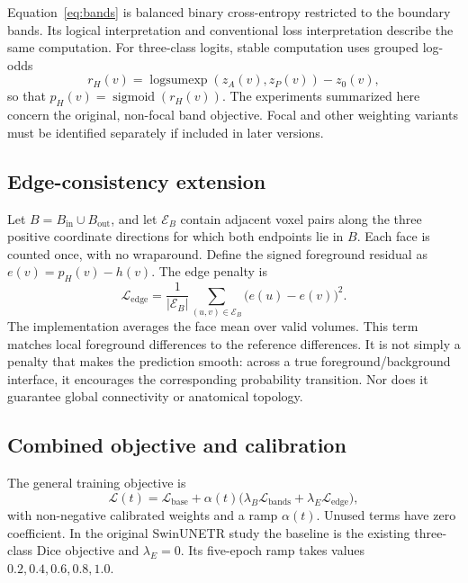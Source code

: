 Equation~\ref{eq:bands} is balanced binary cross-entropy restricted to the boundary bands. Its logical interpretation and conventional loss interpretation describe the same computation. For three-class logits, stable computation uses grouped log-odds
\begin{equation}
r_H(v)=\operatorname{logsumexp}(z_A(v),z_P(v))-z_0(v),
\end{equation}
so that $p_H(v)=\operatorname{sigmoid}(r_H(v))$. The experiments summarized here concern the original, non-focal band objective. Focal and other weighting variants must be identified separately if included in later versions.

\subsection{Edge-consistency extension}
Let $B=B_{\mathrm{in}}\cup B_{\mathrm{out}}$, and let $\mathcal{E}_B$ contain adjacent voxel pairs along the three positive coordinate directions for which both endpoints lie in $B$. Each face is counted once, with no wraparound. Define the signed foreground residual as $e(v)=p_H(v)-h(v)$. The edge penalty is
\begin{equation}\label{eq:edge}
\mathcal{L}_{\mathrm{edge}}=
\frac{1}{|\mathcal{E}_B|}\sum_{(u,v)\in\mathcal{E}_B}
\bigl(e(u)-e(v)\bigr)^2.
\end{equation}
The implementation averages the face mean over valid volumes. This term matches local foreground differences to the reference differences. It is not simply a penalty that makes the prediction smooth: across a true foreground/background interface, it encourages the corresponding probability transition. Nor does it guarantee global connectivity or anatomical topology.

\subsection{Combined objective and calibration}
The general training objective is
\begin{equation}\label{eq:total}
\mathcal{L}(t)=\mathcal{L}_{\mathrm{base}}+
\alpha(t)\bigl(\lambda_B\mathcal{L}_{\mathrm{bands}}+
\lambda_E\mathcal{L}_{\mathrm{edge}}\bigr),
\end{equation}
with non-negative calibrated weights and a ramp $\alpha(t)$. Unused terms have zero coefficient. In the original SwinUNETR study the baseline is the existing three-class Dice objective and $\lambda_E=0$. Its five-epoch ramp takes values $0.2,0.4,0.6,0.8,1.0$.


